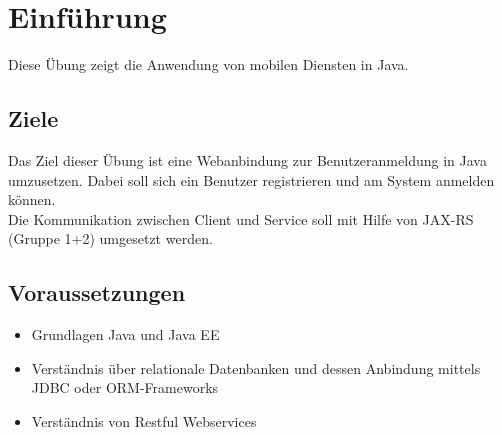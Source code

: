 \documentclass[letterpaper, 12pt]{article}
\let\tempsection\section
\renewcommand\section[1]{\vspace{-0.3cm}\tempsection{#1}\vspace{-0.3cm}}
\let\tempsubsection\subsection
\renewcommand\subsection[1]{\vspace{0cm}\tempsubsection{#1}\vspace{0cm}}
\begin{document}
\parindent 0pt
\parskip 6pt



\clearpage
\thispagestyle{empty}
\tableofcontents

\newpage
{}
\pagestyle{fancy}

\section{Einführung}
Diese Übung zeigt die Anwendung von mobilen Diensten in Java.

\subsection{Ziele}
Das Ziel dieser Übung ist eine Webanbindung zur Benutzeranmeldung in Java umzusetzen. Dabei soll sich ein Benutzer registrieren und am System anmelden können. \\
Die Kommunikation zwischen Client und Service soll mit Hilfe von JAX-RS (Gruppe 1+2) umgesetzt werden.

\subsection{Voraussetzungen}
\begin{itemize}
	\item Grundlagen Java und Java EE
	\item Verständnis über relationale Datenbanken und dessen Anbindung mittels JDBC oder ORM-Frameworks
	\item Verständnis von Restful Webservices
\end{itemize}
\end{document}
